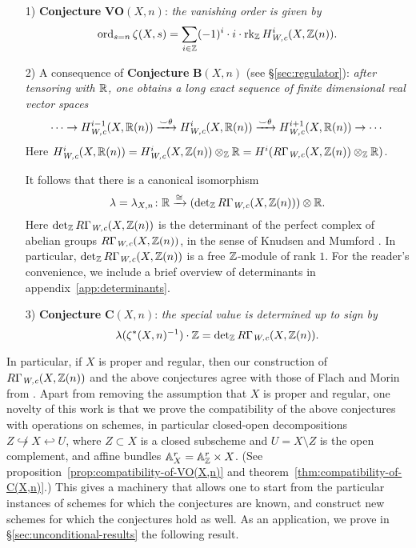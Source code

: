 \documentclass{article}
\numberwithin{equation}{section}
\begin{document}
\begin{enumerate}
\item[1)] \textbf{Conjecture} $\mathbf{VO} (X,n)$:
  \emph{the vanishing order is given by}
  \[ \operatorname{ord}_{s=n} \zeta (X,s) =
    \sum_{i\in \mathbb{Z}} (-1)^i \cdot i \cdot \operatorname{rk}_{\mathbb{Z}} H_{\text{\it W,c}}^i (X, \mathbb{Z}(n)). \]

\item[2)] A consequence of \textbf{Conjecture} $\mathbf{B} (X,n)$
  (see \S\ref{sec:regulator}):
  \emph{after tensoring with $\mathbb{R}$, one obtains a long exact sequence of finite
    dimensional real vector spaces}
  \[ \cdots \to H_{\text{\it W,c}}^{i-1} (X, \mathbb{R} (n)) \xrightarrow{\smile\theta}
    H_{\text{\it W,c}}^i (X, \mathbb{R} (n)) \xrightarrow{\smile\theta}
    H_{\text{\it W,c}}^{i+1} (X, \mathbb{R} (n)) \to \cdots \]
  Here
  $H_{\text{\it W,c}}^i (X, \mathbb{R} (n)) = H_{\text{\it W,c}}^i (X, \mathbb{Z} (n)) \otimes_{\mathbb{Z}} \mathbb{R} =
  H^i (R\Gamma_{\text{\it W,c}} (X, \mathbb{Z} (n)) \otimes_{\mathbb{Z}} \mathbb{R})$.

  It follows that there is a canonical isomorphism
  \[ \lambda = \lambda_{X,n}\colon \mathbb{R} \xrightarrow{\cong}
    (\operatorname{det}_{\mathbb{Z}} R\Gamma_{\text{\it W,c}} (X, \mathbb{Z} (n))) \otimes \mathbb{R}. \]
  Here $\operatorname{det}_{\mathbb{Z}} R\Gamma_{\text{\it W,c}} (X, \mathbb{Z} (n))$ is the determinant of the
  perfect complex of abelian groups $R\Gamma_{\text{\it W,c}} (X, \mathbb{Z} (n))$, in the sense of
  Knudsen and Mumford \cite{Knudsen-Mumford-1976}. In particular,
  $\operatorname{det}_{\mathbb{Z}} R\Gamma_{\text{\it W,c}} (X, \mathbb{Z} (n))$ is a free $\mathbb{Z}$-module of rank
  $1$. For the reader's convenience, we include a brief overview of determinants
  in appendix~\ref{app:determinants}.

\item[3)] \textbf{Conjecture} $\mathbf{C} (X,n)$:
  \emph{the special value is determined up to sign by}
  \[ \lambda (\zeta^* (X, n)^{-1}) \cdot \mathbb{Z} =
    \operatorname{det}_{\mathbb{Z}} R\Gamma_{\text{\it W,c}} (X, \mathbb{Z} (n)). \]
\end{enumerate}

In particular, if $X$ is proper and regular, then our construction of
$R\Gamma_{\text{\it W,c}} (X, \mathbb{Z} (n))$ and the above conjectures agree with those of Flach
and Morin from \cite{Flach-Morin-2018}. Apart from removing the assumption that
$X$ is proper and regular, one novelty of this work is that we prove the
compatibility of the above conjectures with operations on schemes, in particular
closed-open decompositions $Z \not\hookrightarrow X \hookleftarrow U$, where
$Z \subset X$ is a closed subscheme and $U = X\setminus Z$ is the open
complement, and affine bundles $\mathbb{A}_X^r = \mathbb{A}_{\mathbb{Z}}^r \times X$.  (See
proposition~\ref{prop:compatibility-of-VO(X,n)} and
theorem~\ref{thm:compatibility-of-C(X,n)}.) This gives a machinery that allows
one to start from the particular instances of schemes for which the conjectures
are known, and construct new schemes for which the conjectures hold as well.
As an application, we prove in \S\ref{sec:unconditional-results} the following
result.
\end{document}
